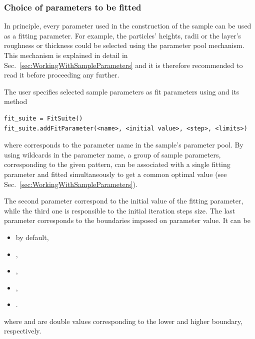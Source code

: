 \subsubsection{Choice of parameters to be fitted}

In principle, every parameter used in the construction of the sample
can be used as a fitting parameter. For example, the particles'
heights, radii or the layer's roughness or thickness could be selected
using the
parameter pool mechanism.
This mechanism is explained in detail in
Sec.~\ref{sec:WorkingWithSampleParameters} and it is therefore recommended
to read it before proceeding any further.

The user specifies selected sample parameters as fit parameters using 
and its  method
\begin{lstlisting}[language=shell, style=commandline]
fit_suite = FitSuite()
fit_suite.addFitParameter(<name>, <initial value>, <step>, <limits>)
\end{lstlisting}
where  corresponds to the parameter name in the sample's parameter pool.
By using wildcards in the parameter name, a group of sample parameters, corresponding to the given
pattern, can be associated with a single fitting parameter and
fitted simultaneously to get a common optimal value (see Sec.~\ref{sec:WorkingWithSampleParameters}).

The second parameter  correspond to the initial value of
the fitting parameter, while the third one
is responsible to the initial iteration steps size.
The last parameter  corresponds to
the boundaries imposed on parameter value. It can be
\begin{itemize}
\item {} by default,
\item {},
\item {},
\item {},
\item {}.
\end{itemize}
where  and  are
double values corresponding to the lower and higher boundary, respectively.


